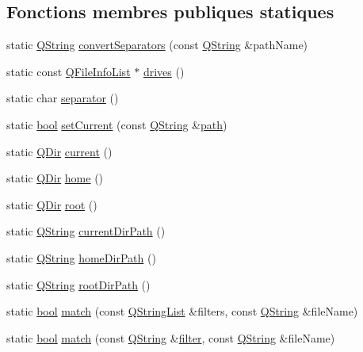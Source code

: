 \subsection*{Fonctions membres publiques statiques}
\begin{DoxyCompactItemize}
\item 
static \hyperlink{class_q_string}{Q\+String} \hyperlink{class_q_dir_a2cb829f147b7225abab1e5915ae62264}{convert\+Separators} (const \hyperlink{class_q_string}{Q\+String} \&path\+Name)
\item 
static const \hyperlink{qdir_8h_a2bab9b680b49f76a34224e15eb238642}{Q\+File\+Info\+List} $\ast$ \hyperlink{class_q_dir_a549c0fc27cf5b4b24310558fe477e178}{drives} ()
\item 
static char \hyperlink{class_q_dir_a8e851d9a1f839208ef0141fde43b414d}{separator} ()
\item 
static \hyperlink{qglobal_8h_a1062901a7428fdd9c7f180f5e01ea056}{bool} \hyperlink{class_q_dir_a61b45775b8b1e2d9ebe069e481f5dc9d}{set\+Current} (const \hyperlink{class_q_string}{Q\+String} \&\hyperlink{class_q_dir_adc89b85ad2479f2b3baf899bfbe48f7f}{path})
\item 
static \hyperlink{class_q_dir}{Q\+Dir} \hyperlink{class_q_dir_a697f013a5d4ae0c805546a2dd8f55707}{current} ()
\item 
static \hyperlink{class_q_dir}{Q\+Dir} \hyperlink{class_q_dir_ab3881e8a981cc34ede0e6e57a1135c20}{home} ()
\item 
static \hyperlink{class_q_dir}{Q\+Dir} \hyperlink{class_q_dir_a61d528e4d5689e81d9c27d68dbd19f64}{root} ()
\item 
static \hyperlink{class_q_string}{Q\+String} \hyperlink{class_q_dir_a987a313fb7600142ed761109991f5a8c}{current\+Dir\+Path} ()
\item 
static \hyperlink{class_q_string}{Q\+String} \hyperlink{class_q_dir_ac112ea98a56191b8b0d84cd967472b39}{home\+Dir\+Path} ()
\item 
static \hyperlink{class_q_string}{Q\+String} \hyperlink{class_q_dir_a66d4102cf6087d51057f8fbd0028def9}{root\+Dir\+Path} ()
\item 
static \hyperlink{qglobal_8h_a1062901a7428fdd9c7f180f5e01ea056}{bool} \hyperlink{class_q_dir_aa78de265f6e5e198a90b4d0252a42df3}{match} (const \hyperlink{class_q_string_list}{Q\+String\+List} \&filters, const \hyperlink{class_q_string}{Q\+String} \&file\+Name)
\item 
static \hyperlink{qglobal_8h_a1062901a7428fdd9c7f180f5e01ea056}{bool} \hyperlink{class_q_dir_a72a73a1e4d9bf42ec4307a70605b77b9}{match} (const \hyperlink{class_q_string}{Q\+String} \&\hyperlink{class_q_dir_a987d4eb30710296adf551c2b48118b28}{filter}, const \hyperlink{class_q_string}{Q\+String} \&file\+Name)

\end{DoxyCompactItemize}

